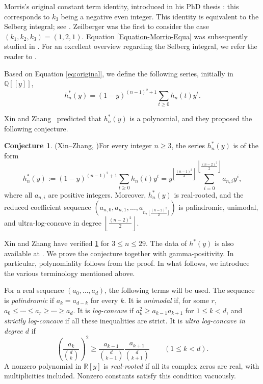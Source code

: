 \documentclass[reqno, 12pt]{article}
\numberwithin{equation}{section}
\theoremstyle{definition}
\newtheorem{conjecture}[theorem]{Conjecture}
\newcommand{\RR}{\mathbb R}
\begin{document}
Morris's original constant term identity, introduced in his PhD thesis \cite{MorrisThesis}: this corresponds to $k_3$ being a negative even integer. This identity is equivalent to the Selberg integral; see \cite{selberg1944}.
Zeilberger \cite{Zeilberger} was the first to consider the case \((k_1, k_2, k_3) = (1, 2, 1)\).
Equation \ref{Equation-Morrio-Equa} was subsequently studied in \cite{morales2021}.
For an excellent overview regarding the Selberg integral, we refer the reader to \cite{forrester2008}.  


Based on Equation \eqref{eq:original}, we define the following series, initially in $\mathbb Q[[y]]$, 
\begin{equation}\label{eq:hstar-definition}
h_n^*(y)=(1-y)^{(n-1)^2+1}\sum_{t\geq0}h_n(t)y^t.
\end{equation}

Xin and Zhang~\cite[Conjecture~5.1]{XZ} predicted that $h_n^*(y)$ is a polynomial, and they proposed the following conjecture.

\begin{conjecture}(Xin--Zhang, \cite[Conjecture~5.1]{XZ})\label{conj:xz}
For every integer $n\geq3$, the series $h_{n}^*(y)$ is of the form
\begin{equation*}
h_{n}^*(y):=(1-y)^{(n-1)^2+1}\sum_{t\geq 0}h_n(t)y^t =y^{\left\lfloor \frac{(n-1)^2}{4}\right\rfloor}\sum_{i=0}^{\left\lfloor \frac{(n-2)^2}{2}\right\rfloor} a_{n,i} y^i,
\end{equation*}
where all $a_{n,i}$ are positive integers.  Moreover, $h_{n}^*(y)$ is real-rooted, and the reduced coefficient sequence $\left(a_{n,0},a_{n,1},\ldots, a_{n,\lfloor \frac{(n-2)^2}{2}\rfloor}\right)$
is palindromic, unimodal, and ultra-log-concave in degree $\left\lfloor \frac{(n-2)^2}{2}\right\rfloor$.
\end{conjecture}

Xin and Zhang have verified \cref{conj:xz} for $3\leq n\leq 29$. The data of $h^*(y)$ is also available at \cite{XZ}.
We prove the conjecture together with gamma-positivity.  In particular, polynomiality follows from the proof.
In what follows, we introduce the various terminology mentioned above.

For a real sequence $(a_0,\ldots,a_d)$, the following terms will
be used.  The sequence is \emph{palindromic} if $a_k=a_{d-k}$ for
every $k$.  It is \emph{unimodal} if, for some $r$,
$a_0\leq\cdots\leq a_r\geq\cdots\geq a_d$.
It is \emph{log-concave} if $a_k^2\geq a_{k-1}a_{k+1}$ for
$1\leq k<d$, and \emph{strictly log-concave} if all these
inequalities are strict.  It is \emph{ultra log-concave in degree
$d$} if
\begin{equation}\label{eq:ulc-definition}
\left(\frac{a_k}{\binom dk}\right)^2
\geq
\frac{a_{k-1}}{\binom d{k-1}}
\frac{a_{k+1}}{\binom d{k+1}}
\qquad(1\leq k<d).
\end{equation}
A nonzero polynomial in $\RR[y]$ is \emph{real-rooted} if all its
complex zeros are real, with multiplicities included.  Nonzero
constants satisfy this condition vacuously.
\end{document}
